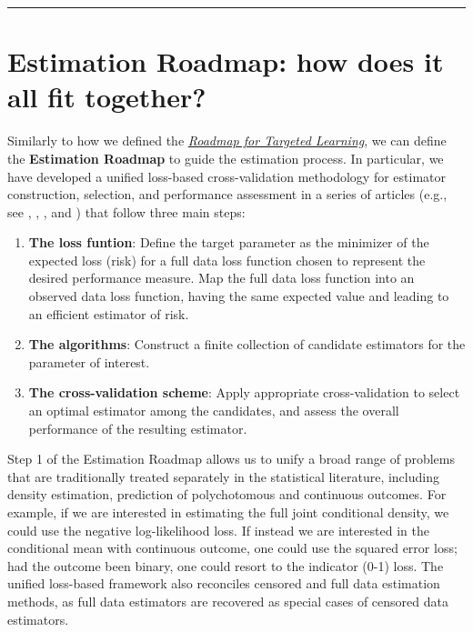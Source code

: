\documentclass[12pt, krantz2,]{book}
\theoremstyle{definition}
\theoremstyle{definition}
\theoremstyle{definition}
\newcommand{\1}{\mathbbm{1}}
\begin{document}
\begin{center}\rule{0.5\linewidth}{0.5pt}\end{center}

\hypertarget{estimation-roadmap-how-does-it-all-fit-together}{%
\section{Estimation Roadmap: how does it all fit together?}\label{estimation-roadmap-how-does-it-all-fit-together}}

Similarly to how we defined the \protect\hyperlink{roadmap}{\emph{Roadmap for Targeted Learning}}, we
can define the \textbf{Estimation Roadmap} to guide the estimation process. In
particular, we have developed a unified loss-based cross-validation methodology
for estimator construction, selection, and performance assessment in a series of
articles (e.g., see \citet{vdl2004asymptotic}, \citet{dudoit2005asymptotics},
\citet{vaart2006oracle}, and \citet{vdl2007super}) that follow three main steps:

\begin{enumerate}
\def\labelenumi{\arabic{enumi}.}
\item
  \textbf{The loss funtion}:
  Define the target parameter as the minimizer of the expected loss (risk) for a
  full data loss function chosen to represent the desired performance measure.
  Map the full data loss function into an observed data loss function, having the
  same expected value and leading to an efficient estimator of risk.
\item
  \textbf{The algorithms}:
  Construct a finite collection of candidate estimators for the parameter of
  interest.
\item
  \textbf{The cross-validation scheme}:
  Apply appropriate cross-validation to select an optimal estimator among the
  candidates, and assess the overall performance of the resulting estimator.
\end{enumerate}

Step 1 of the Estimation Roadmap allows us to unify a broad range of problems
that are traditionally treated separately in the statistical literature,
including density estimation, prediction of polychotomous and continuous
outcomes. For example, if we are interested in estimating the full joint
conditional density, we could use the negative log-likelihood loss. If instead
we are interested in the conditional mean with continuous outcome, one could use
the squared error loss; had the outcome been binary, one could resort to the
indicator (0-1) loss. The unified loss-based framework also reconciles censored
and full data estimation methods, as full data estimators are recovered as
special cases of censored data estimators.
\end{document}

